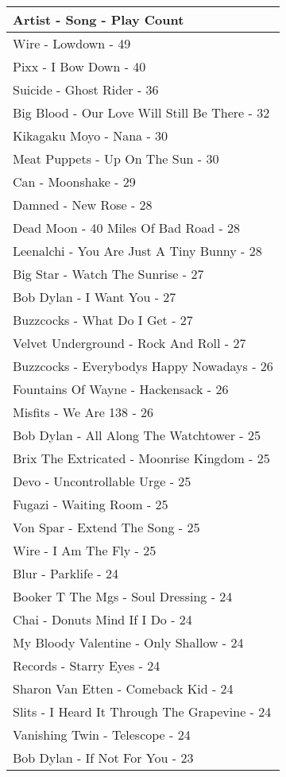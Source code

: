 \documentclass[
]{article}
\begin{document}
\captionsetup[table]{labelformat=empty,skip=1pt}
\begin{longtable}{l}
\toprule
\textbf{Artist - Song - Play Count} \\ 
\midrule
Wire - Lowdown - 49 \\ 
Pixx - I Bow Down - 40 \\ 
Suicide - Ghost Rider - 36 \\ 
Big Blood - Our Love Will Still Be There - 32 \\ 
Kikagaku Moyo - Nana - 30 \\ 
Meat Puppets - Up On The Sun - 30 \\ 
Can - Moonshake - 29 \\ 
Damned - New Rose - 28 \\ 
Dead Moon - 40 Miles Of Bad Road - 28 \\ 
Leenalchi - You Are Just A Tiny Bunny - 28 \\ 
Big Star - Watch The Sunrise - 27 \\ 
Bob Dylan - I Want You - 27 \\ 
Buzzcocks - What Do I Get - 27 \\ 
Velvet Underground - Rock And Roll - 27 \\ 
Buzzcocks - Everybodys Happy Nowadays - 26 \\ 
Fountains Of Wayne - Hackensack - 26 \\ 
Misfits - We Are 138 - 26 \\ 
Bob Dylan - All Along The Watchtower - 25 \\ 
Brix The Extricated - Moonrise Kingdom - 25 \\ 
Devo - Uncontrollable Urge - 25 \\ 
Fugazi - Waiting Room - 25 \\ 
Von Spar - Extend The Song - 25 \\ 
Wire - I Am The Fly - 25 \\ 
Blur - Parklife - 24 \\ 
Booker T The Mgs - Soul Dressing - 24 \\ 
Chai - Donuts Mind If I Do - 24 \\ 
My Bloody Valentine - Only Shallow - 24 \\ 
Records - Starry Eyes - 24 \\ 
Sharon Van Etten - Comeback Kid - 24 \\ 
Slits - I Heard It Through The Grapevine - 24 \\ 
Vanishing Twin - Telescope - 24 \\ 
Bob Dylan - If Not For You - 23 \\ 

\end{longtable}
\end{document}
